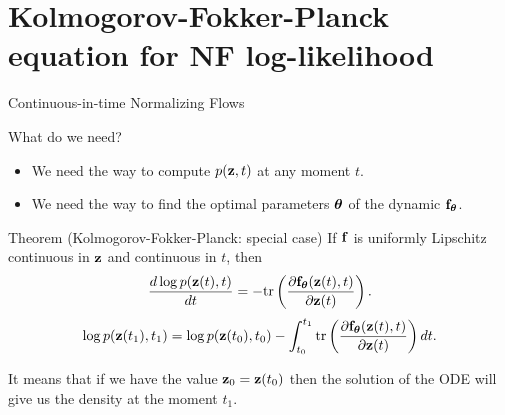 \section{Kolmogorov-Fokker-Planck equation for NF log-likelihood}
\begin{frame}{Continuous-in-time Normalizing Flows}
	\begin{block}{What do we need?}
		\begin{itemize}
			\item We need the way to compute $p(\mathbf{z}, t)$ at any moment $t$.
			\item We need the way to find the optimal parameters $\boldsymbol{\theta}$ of the dynamic $\mathbf{f}_{\boldsymbol{\theta}}$.
		\end{itemize}
	\end{block}
	\vspace{-0.3cm}
	\begin{block}{Theorem (Kolmogorov-Fokker-Planck: special case)}
		If $\mathbf{f}$ is uniformly Lipschitz continuous in $\mathbf{z}$ and continuous in $t$, then
		\[
			\frac{d \log p(\mathbf{z}(t), t)}{d t} = - \text{tr} \left( \frac{\partial \mathbf{f}_{\boldsymbol{\theta}}(\mathbf{z}(t), t)}{\partial \mathbf{z}(t)} \right).
		\]
		\[
			\log p(\mathbf{z}(t_1), t_1) = \log p(\mathbf{z}(t_0), t_0) - \int_{t_0}^{t_1} \text{tr}  \left( \frac{\partial \mathbf{f}_{\boldsymbol{\theta}}(\mathbf{z}(t), t)}{\partial \mathbf{z}(t)} \right) dt.
		\]
	\end{block}
	It means that if we have the value $\mathbf{z}_0 = \mathbf{z}(t_0)$ then the solution of the ODE will give us the density at the moment $t_1$.
\end{frame}
